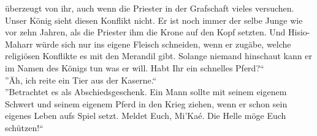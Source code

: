 überzeugt von ihr, auch wenn die Priester in der Grafschaft vieles versuchen. Unser König sieht 
diesen Konflikt nicht. Er ist noch immer der selbe Junge wie vor zehn Jahren, als die Priester ihm 
die Krone auf den Kopf setzten. Und Hisio-Maharr würde sich nur ins eigene Fleisch schneiden, wenn 
er zugäbe, welche religiösen Konflikte es mit den Merandil gibt. Solange niemand hinschaut kann er 
im Namen des Königs tun was er will. Habt Ihr ein schnelles Pferd?``\\
''Äh, ich reite ein Tier aus der Kaserne.``\\
''Betrachtet es als Abschiedsgeschenk. Ein Mann sollte mit seinem eigenem Schwert und seinem 
eigenem Pferd in den Krieg ziehen, wenn er schon sein eigenes Leben aufs Spiel setzt. Meldet 
Euch, Mi'Kaé. Die Helle möge Euch schützen!`` \\




